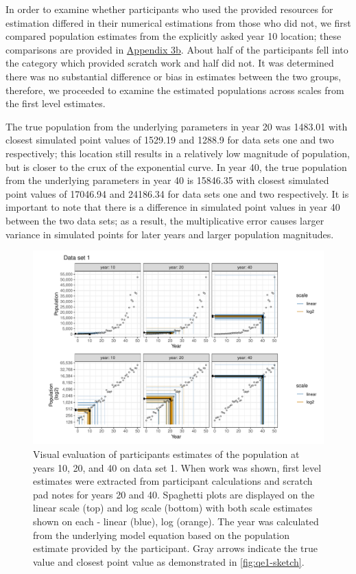 \documentclass[print]{nuthesis}
\begin{document}
In order to examine whether participants who used the provided resources for estimation differed in their numerical estimations from those who did not, we first compared population estimates from the explicitly asked year 10 location; these comparisons are provided in \protect\hyperlink{estimation-comparison}{Appendix 3b}.
About half of the participants fell into the category which provided scratch work and half did not.
It was determined there was no substantial difference or bias in estimates between the two groups, therefore, we proceeded to examine the estimated populations across scales from the first level estimates.

The true population from the underlying parameters in year 20 was 1483.01 with closest simulated point values of 1529.19 and 1288.9 for data sets one and two respectively; this location still results in a relatively low magnitude of population, but is closer to the crux of the exponential curve.
In year 40, the true population from the underlying parameters in year 40 is 15846.35 with closest simulated point values of 17046.94 and 24186.34 for data sets one and two respectively.
It is important to note that there is a difference in simulated point values in year 40 between the two data sets; as a result, the multiplicative error causes larger variance in simulated points for later years and larger population magnitudes.

\begin{figure}[tbp]

{\centering \includegraphics[width=1\linewidth,]{thesis_files/figure-latex/spaghetti-dataset1-1} 

}

\caption[Estimated population spaghetti plot: data set 1]{Visual evaluation of participants estimates of the population at years 10, 20, and 40 on data set 1. When work was shown, first level estimates were extracted from participant calculations and scratch pad notes for years 20 and 40. Spaghetti plots are displayed on the linear scale (top) and log scale (bottom) with both scale estimates shown on each - linear (blue), log (orange). The year was calculated from the underlying model equation based on the population estimate provided by the participant. Gray arrows indicate the true value and closest point value as demonstrated in \cref{fig:qe1-sketch}.}\label{fig:spaghetti-dataset1}
\end{figure}
\end{document}
